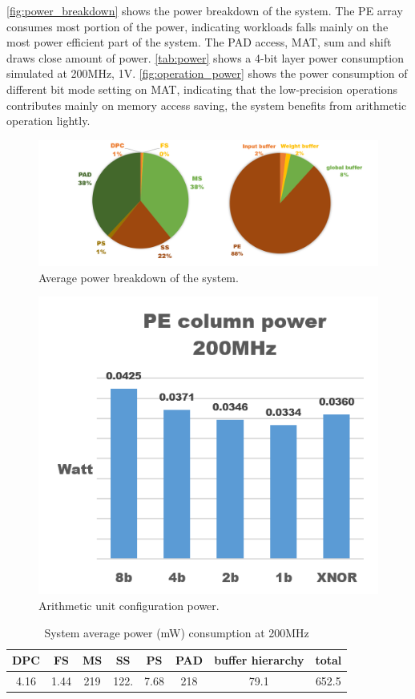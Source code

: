 \autoref{fig:power_breakdown} shows the power breakdown of the system. The PE array consumes most portion of the power, indicating workloads falls mainly on the most power efficient part of the system. The PAD access, MAT, sum and shift draws close amount of power. \autoref{tab:power} shows a 4-bit layer power consumption simulated at 200MHz, 1V. \autoref{fig:operation_power} shows the power consumption of different bit mode setting on MAT, indicating that the low-precision operations contributes mainly on memory access saving, the system benefits from arithmetic operation lightly.
\begin{figure}[h]
    \centering
    \includegraphics[width=1\linewidth]{inc/5_results/figure/power_breakdown.png}
    \caption{Average power breakdown of the system.}
    \label{fig:power_breakdown}
\end{figure}

\begin{figure}
    \centering
    \includegraphics[width=0.4\linewidth]{inc/5_results/figure/operation_power.png}
    \caption{Arithmetic unit configuration power.}
    \label{fig:operation_power}
\end{figure}
\begin{table}[h]
    \caption{System average power (mW) consumption at 200MHz}
    \label{tab:power}
    \centering
    \footnotesize 
        \begin{tabular}{cccccccc}
        DPC  & FS   & MS    & SS     & PS   & PAD     & buffer hierarchy & total   \\
        \toprule
        4.16 & 1.44 & 219 & 122. & 7.68 & 218 & 79.1           & 652.5\\
        \bottomrule
        \end{tabular}
\end{table}






